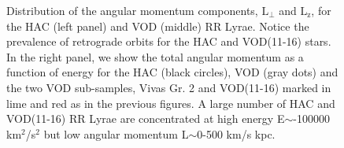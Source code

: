 \documentclass[fleqn,usenatbib]{mnras}
\begin{document}
\begin{figure}
		       	       	       	       \vspace{-0.45cm}
   \caption{Distribution of the angular momentum components,
     $\mathrm{L_{\perp}}$ and $\mathrm{L_{z}}$, for the HAC (left
     panel) and VOD (middle) RR Lyrae. Notice the prevalence of
     retrograde orbits for the HAC and VOD(11-16) stars. In the right
     panel, we show the total angular momentum as a function of energy
     for the HAC (black circles), VOD (gray dots) and the two VOD
     sub-samples, Vivas Gr. 2 and VOD(11-16) marked in lime and red as
     in the previous figures. A large number of HAC and VOD(11-16) RR
     Lyrae are concentrated at high energy E$\sim$-100000
     km$^{2}$/s$^{2}$ but low angular momentum L$\sim$0-500 km/s kpc.}
    \label{fig:energy}
\end{figure}
%
\end{document}
